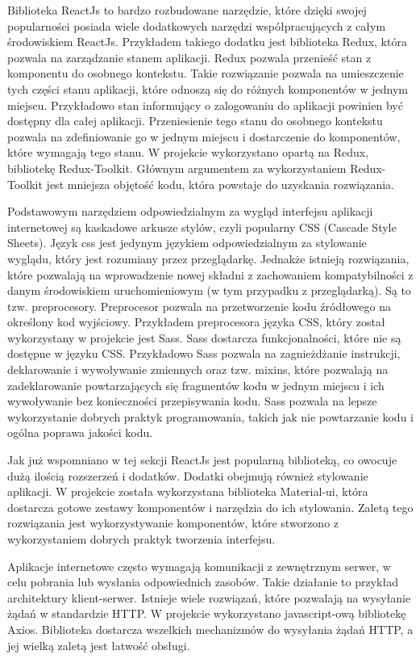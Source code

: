 \documentclass[a4paper,12pt]{book}
\begin{document}
Biblioteka ReactJs to bardzo rozbudowane narzędzie, które dzięki swojej popularności posiada wiele dodatkowych narzędzi współpracujących z całym środowiskiem ReactJs. Przykładem takiego dodatku jest biblioteka Redux, która pozwala na zarządzanie stanem aplikacji. Redux pozwala przenieść stan z komponentu do osobnego kontekstu. Takie rozwiązanie pozwala na umieszczenie tych części stanu aplikacji, które odnoszą się do różnych komponentów w jednym miejscu. Przykładowo stan informujący o zalogowaniu do aplikacji powinien być dostępny dla całej aplikacji. Przeniesienie tego stanu do osobnego kontekstu pozwala na zdefiniowanie go w jednym miejscu i dostarczenie do komponentów, które wymagają tego stanu. W projekcie wykorzystano opartą na Redux, bibliotekę Redux-Toolkit. Głównym argumentem za wykorzystaniem Redux-Toolkit jest mniejsza objętość kodu, która powstaje do uzyskania rozwiązania.

Podstawowym narzędziem odpowiedzialnym za wygląd interfejsu aplikacji internetowej są kaskadowe arkusze stylów, czyli popularny CSS (Cascade Style Sheets). Język css jest jedynym językiem odpowiedzialnym za stylowanie wyglądu, który jest rozumiany przez przeglądarkę. Jednakże istnieją rozwiązania, które pozwalają na wprowadzenie nowej składni z zachowaniem kompatybilności z danym środowiskiem uruchomieniowym (w tym przypadku z przeglądarką). Są to tzw. preprocesory. Preprocesor pozwala na przetworzenie kodu źródłowego na określony kod wyjściowy. Przykładem preprocesora języka CSS, który został wykorzystany w projekcie jest Sass. Sass dostarcza funkcjonalności, które nie są dostępne w języku CSS. Przykładowo Sass pozwala na zagnieżdżanie instrukcji, deklarowanie i wywoływanie zmiennych oraz tzw. mixins, które pozwalają na zadeklarowanie powtarzających się fragmentów kodu w jednym miejscu i ich wywoływanie bez konieczności przepisywania kodu. Sass pozwala na lepsze wykorzystanie dobrych praktyk programowania, takich jak nie powtarzanie kodu i ogólna poprawa jakości kodu.

Jak już wspomniano w tej sekcji ReactJs jest popularną biblioteką, co owocuje dużą ilością rozszerzeń i dodatków. Dodatki obejmują również stylowanie aplikacji. W projekcie została wykorzystana biblioteka Material-ui, która dostarcza gotowe zestawy komponentów i narzędzia do ich stylowania. Zaletą tego rozwiązania jest wykorzystywanie komponentów, które stworzono z wykorzystaniem dobrych praktyk tworzenia interfejsu.

Aplikacje internetowe często wymagają komunikacji z zewnętrznym serwer, w celu pobrania lub wysłania odpowiednich zasobów. Takie działanie to przykład architektury klient-serwer. Istnieje wiele rozwiązań, które pozwalają na wysyłanie żądań w standardzie HTTP. W projekcie wykorzystano javascript-ową bibliotekę Axios. Biblioteka dostarcza wszelkich mechanizmów do wysyłania żądań HTTP, a jej wielką zaletą jest łatwość obsługi.
\end{document}
